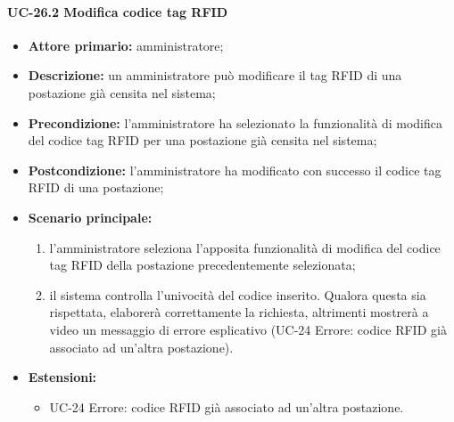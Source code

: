 \paragraph{UC-26.2 Modifica codice tag RFID}
\begin{itemize}
    \item \textbf{Attore primario:} amministratore;
    \item \textbf{Descrizione:} un amministratore pu\`{o} modificare il tag RFID di una postazione già censita nel sistema;
    \item \textbf{Precondizione:} l'amministratore ha selezionato la funzionalità di modifica del codice tag RFID per una postazione già censita nel sistema;
    \item \textbf{Postcondizione:} l'amministratore ha modificato con successo il codice tag RFID di una postazione;
    \item \textbf{Scenario principale:}
    \begin{enumerate}
        \item l'amministratore seleziona l'apposita funzionalità di modifica del codice tag RFID della postazione precedentemente selezionata;
        \item il sistema controlla l'univocità del codice inserito. Qualora questa sia rispettata, elaborerà correttamente la richiesta, altrimenti mostrerà a video un messaggio di errore esplicativo (UC-24 Errore: codice RFID già associato ad un'altra postazione).
    \end{enumerate}
    \item \textbf{Estensioni:}
		\begin{itemize}
		      \item UC-24 Errore: codice RFID già associato ad un'altra postazione.
	      \end{itemize}
\end{itemize}

 
